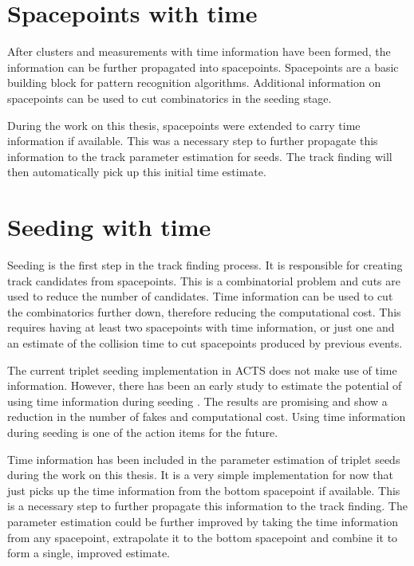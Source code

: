 \section{Spacepoints with time}

After clusters and measurements with time information have been formed, the information can be further propagated into spacepoints. Spacepoints are a basic building block for pattern recognition algorithms. Additional information on spacepoints can be used to cut combinatorics in the seeding stage.

During the work on this thesis, spacepoints were extended to carry time information if available. This was a necessary step to further propagate this information to the track parameter estimation for seeds. The track finding will then automatically pick up this initial time estimate.

\section{Seeding with time}

Seeding is the first step in the track finding process. It is responsible for creating track candidates from spacepoints. This is a combinatorial problem and cuts are used to reduce the number of candidates. Time information can be used to cut the combinatorics further down, therefore reducing the computational cost. This requires having at least two spacepoints with time information, or just one and an estimate of the collision time to cut spacepoints produced by previous events.

The current triplet seeding implementation in ACTS does not make use of time information. However, there has been an early study to estimate the potential of using time information during seeding \cite{bos_2023_h2cbz-as705}. The results are promising and show a reduction in the number of fakes and computational cost. Using time information during seeding is one of the action items for the future.

Time information has been included in the parameter estimation of triplet seeds during the work on this thesis. It is a very simple implementation for now that just picks up the time information from the bottom spacepoint if available. This is a necessary step to further propagate this information to the track finding. The parameter estimation could be further improved by taking the time information from any spacepoint, extrapolate it to the bottom spacepoint and combine it to form a single, improved estimate.

